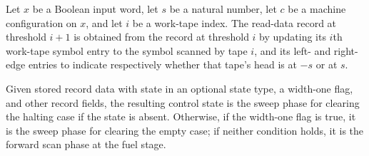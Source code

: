 \begin{theorem}
\label{Turing.recordStepReadData_succ}
\leanok
{}
Let $x$ be a Boolean input word, let $s$ be a natural number, let $c$ be a machine
configuration on $x$, and let $i$ be a work-tape index. The read-data record at
threshold $i+1$ is obtained from the record at threshold $i$ by updating its $i$th
work-tape symbol entry to the symbol scanned by tape $i$, and its left- and right-edge
entries to indicate respectively whether that tape's head is at $-s$ or at $s$.
\end{theorem}

\begin{definition}
\label{Turing.recordStepReadExit}
\leanok
{}
Given stored record data with state in an optional state type, a width-one flag, and
other record fields, the resulting control state is the sweep phase for clearing the
halting case if the state is absent. Otherwise, if the width-one flag is true, it is the
sweep phase for clearing the empty case; if neither condition holds, it is the forward
scan phase at the fuel stage.
\end{definition}

